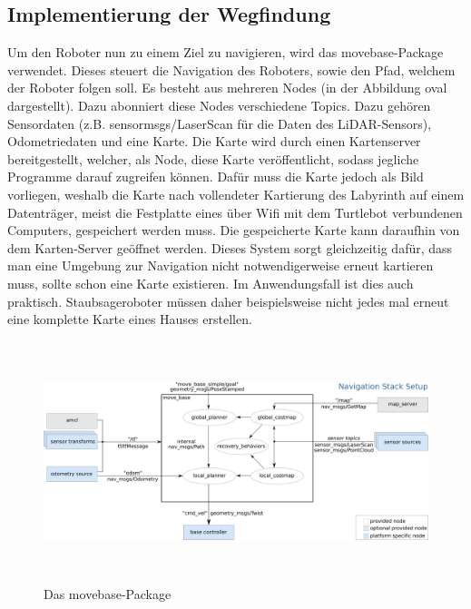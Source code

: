 {		\subsection{Implementierung der Wegfindung} %
		{
			Um den Roboter nun zu einem Ziel zu navigieren, wird das move\textunderscore base-Package verwendet. Dieses steuert die Navigation des Roboters, sowie den Pfad, welchem der Roboter folgen soll. Es besteht aus mehreren Nodes (in der Abbildung oval dargestellt).  Dazu abonniert diese Nodes verschiedene Topics. Dazu gehören Sensordaten (z.B. sensor\textunderscore msgs/LaserScan für die Daten des LiDAR-Sensors), Odometriedaten und eine Karte. Die Karte wird durch einen Kartenserver bereitgestellt, welcher, als Node, diese Karte veröffentlicht, sodass jegliche Programme darauf zugreifen können. Dafür muss die Karte jedoch als Bild vorliegen, weshalb die Karte nach vollendeter Kartierung des Labyrinth auf einem Datenträger, meist die Festplatte eines über Wifi mit dem Turtlebot verbundenen Computers, gespeichert werden muss. Die gespeicherte Karte kann daraufhin von dem Karten-Server geöffnet werden. Dieses System sorgt gleichzeitig dafür, dass man eine Umgebung zur Navigation nicht notwendigerweise erneut kartieren muss, sollte schon eine Karte existieren. Im Anwendungsfall ist dies auch praktisch. Staubsageroboter müssen daher beispielsweise nicht jedes mal erneut eine komplette Karte eines Hauses erstellen.
			\begin{figure}[H]
				\centering
				\includegraphics[height=7cm]{Bilder/overview_move_base.png}
				\caption{Das move\textunderscore base-Package \\
					\parencite{movebasenodeoverview}} 
				\label{pic:overviewmovebase}
			\end{figure}
			
}}
